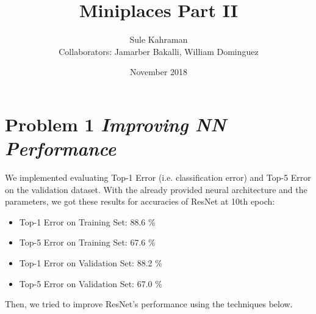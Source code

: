\documentclass{article}
\title{Miniplaces Part II}
\author{Sule Kahraman\\
        Collaborators: Jamarber Bakalli, William Dominguez}
\date{November 2018}
\begin{document}
\maketitle

\section{Problem 1 \textit{Improving NN Performance}}
We implemented evaluating Top-1 Error (i.e. classification error)
and Top-5 Error on the validation dataset. With the already provided neural architecture and the parameters, we got these results for accuracies of ResNet at 10th epoch:
\begin{itemize}
    \item Top-1 Error on Training Set: 88.6 \%
    \item Top-5 Error on Training Set: 67.6 \%
    \item Top-1 Error on Validation Set: 88.2 \%
    \item Top-5 Error on Validation Set: 67.0 \%
\end{itemize}

Then, we tried to improve ResNet's performance using the techniques below.
\end{document}
